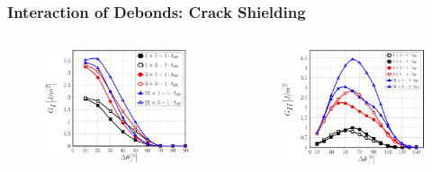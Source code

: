 \documentclass[first,firstsupp,lastsupp,last,hyperref,table]{ETHclass}
\begin{document}
\begin{frame}
\frametitle{\vspace{0.2cm}\small Interaction of Debonds: Crack Shielding}
\vspace{-.75cm}
\centering
\begin{columns}[c]
\centering
\begin{column}{0.5\textwidth}
\centering
\begin{figure}
\centering
\includegraphics[width=\columnwidth]{nxk-1-vf60-GI-crackshield1.pdf}
\end{figure}
\end{column}
\begin{column}{0.5\textwidth}
\centering
\begin{figure}
\centering
\includegraphics[width=\columnwidth]{nxk-1-vf60-GII-crackshield1.pdf}

\end{figure}
\end{column}
\end{columns}
\end{frame}
\end{document}
